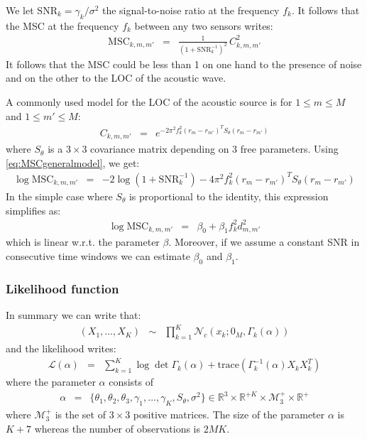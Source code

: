 \documentclass[a4paper, 12pt]{report}
\newcommand{\trace}[1]{\mathrm{trace}\left( #1 \right)}
\def\SNR{\mathrm{SNR}}
\def\MSC{\mathrm{MSC}}
\begin{document}
We let $\SNR_{k}=\gamma_{k}/\sigma^2$ the signal-to-noise ratio at the frequency $f_{k}$. It follows that the MSC at the frequency $f_{k}$  between any two sensors writes:
\begin{eqnarray}
\label{eq:MSCgeneralmodel}
 \MSC_{k,m,m'}&=& \frac{1}{(1+\SNR_{k}^{-1})^2}\,C_{k,m,m'}^{2}
\end{eqnarray}
It follows that the MSC could be less than 1 on one hand to the presence of noise and on the other to the LOC of the acoustic wave.


A commonly used model for the LOC of the acoustic source is for $1\leq m\leq M$ and $1\leq m'\leq M$:
\begin{eqnarray}
 \label{eq:CkwithGauss}
 C_{k,m,m'} &=&e^{-2\pi^2f_k^2(r_{m}-r_{m'})^TS_{\theta}(r_{m}-r_{m'})}
\end{eqnarray}
where $S_{\theta}$ is a $3\times 3$ covariance matrix depending on 3 free parameters. Using \eqref{eq:MSCgeneralmodel}, we get:
\begin{eqnarray*}
\label{eq:MSCgaussianmodel}
 \log \MSC_{k,m,m'}&=& -2 \log(1+\SNR_{k}^{-1})
-4\pi^2f_k^2(r_{m}-r_{m'})^TS_{\theta}(r_{m}-r_{m'})
\end{eqnarray*}
In the simple case where $S_{\theta}$ is proportional to the identity, this expression simplifies as:
\begin{eqnarray}
\label{eq:logMSCgaussianmodel}
 \log \MSC_{k,m,m'}&=& \beta_{0}+\beta_{1} f_k^2 d_{m,m'}^2
\end{eqnarray}
which is linear w.r.t. the parameter $\beta$. Moreover, if we assume a constant SNR in consecutive time windows we can estimate $\beta_0$ and $\beta_1$.


\subsubsection{Likelihood function}
In summary   we can write that:
\begin{eqnarray*}
 (X_{1},\ldots,X_{K}) &\sim&\prod_{k=1}^{K}\mathcal{N}_{c}(x_{k};0_{M},\Gamma_{k}(\alpha))
\end{eqnarray*}
and the likelihood writes:
\begin{eqnarray}
 \label{eq:likelihood-function}
 \mathcal{L}(\alpha)&=&
 \sum_{k=1}^{K}\log\det\Gamma_{k}(\alpha)+\trace{\Gamma_{k}^{-1}(\alpha)X_{k}X_{k}^{T}}
\end{eqnarray}
where the parameter $\alpha$ consists of
\begin{eqnarray}
\alpha&=&
\{
\theta_{1},\theta_{2},\theta_{3},\gamma_{1},\ldots,\gamma_{K},S_{\theta},\sigma^{2}
\}
\in \mathds{R}^{3}\times\mathds{R}^{+K}\times   \mathcal{M}_{3}^{+}\times \mathds{R}^{+}
\end{eqnarray}
where $\mathcal{M}_{3}^{+}$ is the set of $3\times 3$ positive matrices. The size of the parameter $\alpha$ is $K+7$ whereas the number of observations is $2MK$.
\end{document}
